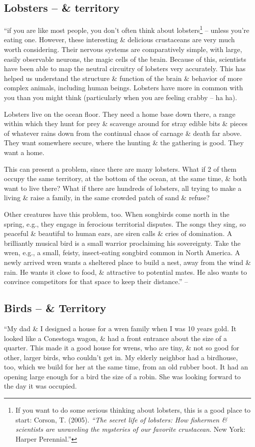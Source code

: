 \documentclass[oneside]{book}
\numberwithin{equation}{section}
\begin{document}
\subsection{Lobsters -- \& territory}
``if you are like most people, you don't often think about lobsters\footnote{If you want to do some serious thinking about lobsters, this is a good place to start: Corson, T. (2005). \textit{``The secret life of lobsters: How fishermen \& scientists are unraveling the mysteries of our favorite crustacean}. New York: Harper Perennial.''} -- unless you're eating one. However, these interesting \& delicious crustaceans are very much worth considering. Their nervous systems are comparatively simple, with large, easily observable neurons, the magic cells of the brain. Because of this, scientists have been able to map the neutral circuitry of lobsters very accurately. This has helped us understand the structure \& function of the brain \& behavior of more complex animals, including human beings. Lobsters have more in common with you than you might think (particularly when you are feeling crabby -- ha ha).

Lobsters live on the ocean floor. They need a home base down there, a range within which they hunt for prey \& scavenge around for stray edible bits \& pieces of whatever rains down from the continual chaos of carnage \& death far above. They want somewhere secure, where the hunting \& the gathering is  good. They want a home.

This can present a problem, since there are many lobsters. What if 2 of them occupy the same territory, at the bottom of the ocean, at the same time, \& both want to live there? What if there are hundreds of lobsters, all trying to make a living \& raise a family, in the same crowded patch of sand \& refuse?

Other creatures have this problem, too. When songbirds come north in the spring, e.g., they engage in ferocious territorial disputes. The songs they sing, so peaceful \& beautiful to human ears, are siren calls \& cries of domination. A brilliantly musical bird is a small warrior proclaiming his sovereignty. Take the wren, e.g., a small, feisty, insect-eating songbird common in North America. A newly arrived wren wants a sheltered place to build a nest, away from the wind \& rain. He wants it close to food, \& attractive to potential mates. He also wants to convince competitors for that space to keep their distance.'' -- \cite[pp. 31--32]{Peterson2018}

\subsection{Birds -- \& Territory}
``My dad \& I designed a house for a wren family when I was 10 years gold. It looked like a Conestoga wagon, \& had a front entrance about the size of a quarter. This made it a good house for wrens, who are tiny, \& not so good for other, larger birds, who couldn't get in. My elderly neighbor had a birdhouse, too, which we build for her at the same time, from an old rubber boot. It had an opening large enough for a bird the size of a robin. She was looking forward to the day it was occupied.
\end{document}
